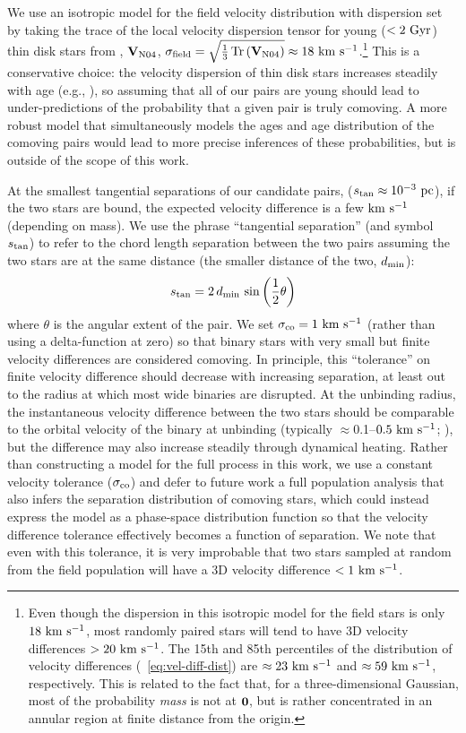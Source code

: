 \documentclass[modern, letterpaper]{aastex61}
\DeclareMathOperator{\Tr}{Tr}
\begin{document}
We use an isotropic model for the field velocity distribution with dispersion
set by taking the trace of the local velocity dispersion tensor for young
($<2~{\rm Gyr}$) thin disk stars from \citealt{Nordstrom:2004}, $\mathbf{V}_{\rm
N04}$, $\sigma_{\rm field} =
\sqrt{\frac{1}{3}\Tr{\left(\mat{V}_{\rm N04}\right)}} \approx
18~\kms$.\footnote{Even though the dispersion in this isotropic model for the
field stars is only $18~\mathrm{km}~\mathrm{s}^{-1}$, most randomly paired stars will tend to have 3D
velocity differences $>20~\mathrm{km}~\mathrm{s}^{-1}$.
The 15th and 85th percentiles of the distribution of velocity differences
(\eqname~\ref{eq:vel-diff-dist}) are $\approx 23~\mathrm{km}~\mathrm{s}^{-1}$ and $\approx 59~\mathrm{km}~\mathrm{s}^{-1}$,
respectively.
This is related to the fact that, for a three-dimensional Gaussian, most of the
probability \emph{mass} is not at $\boldsymbol{0}$, but is rather concentrated in an
annular region at finite distance from the origin.}
This is a conservative choice: the velocity dispersion of thin disk stars
increases steadily with age (e.g., \citealt{Aumer:2016}), so assuming that all
of our pairs are young should lead to under-predictions of the probability that
a given pair is truly comoving.
A more robust model that simultaneously models the ages and age distribution of
the comoving pairs would lead to more precise inferences of these probabilities,
but is outside of the scope of this work.

At the smallest tangential separations of our candidate pairs, ($s_{\rm tan}
\approx 10^{-3}~\mathrm{pc}$), if the two stars are bound, the expected velocity
difference is a few $\mathrm{km}~\mathrm{s}^{-1}$ (depending on mass).
We use the phrase ``tangential separation'' (and symbol $s_{\rm tan}$) to refer
to the chord length separation between the two pairs assuming the two stars are
at the same distance (the smaller distance of the two, $d_{\rm min}$):
\begin{equation}
    s_{\rm tan} = 2\, d_{\rm min} \, \sin{\left( \frac{1}{2}\theta \right)}
\end{equation}
where $\theta$ is the angular extent of the pair.
We set $\sigma_{\rm co} = 1~\mathrm{km}~\mathrm{s}^{-1}$ (rather than using a delta-function at zero)
so that binary stars with very small but finite velocity differences are
considered comoving.
In principle, this ``tolerance'' on finite velocity difference should decrease
with increasing separation, at least out to the radius at which most wide
binaries are disrupted.
At the unbinding radius, the instantaneous velocity difference between the two
stars should be comparable to the orbital velocity of the binary at unbinding
(typically $\approx$0.1--$0.5~\mathrm{km}~\mathrm{s}^{-1}$; \citealt{Jiang:2010}), but the difference
may also increase steadily through dynamical heating.
Rather than constructing a model for the full process in this work, we use a
constant velocity tolerance ($\sigma_{\rm co}$) and defer to future work a full
population analysis that also infers the separation distribution of comoving
stars, which could instead express the model as a phase-space distribution
function so that the velocity difference tolerance effectively becomes a
function of separation.
We note that even with this tolerance, it is very improbable that two stars
sampled at random from the field population will have a 3D velocity difference
$<1~\mathrm{km}~\mathrm{s}^{-1}$.
\end{document}
